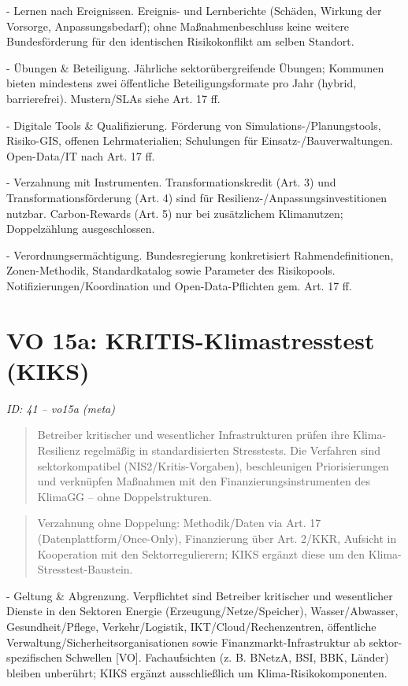 \documentclass[12pt,a4paper]{scrartcl}
\begin{document}
- Lernen nach Ereignissen. Ereignis- und Lernberichte (Schäden, Wirkung der Vorsorge, Anpassungsbedarf); ohne Maßnahmenbeschluss keine weitere Bundesförderung für den identischen Risikokonflikt am selben Standort.

- Übungen \& Beteiligung. Jährliche sektorübergreifende Übungen; Kommunen bieten mindestens zwei öffentliche Beteiligungsformate pro Jahr (hybrid, barrierefrei). Mustern/SLAs siehe Art. 17 ff.

- Digitale Tools \& Qualifizierung. Förderung von Simulations-/Planungstools, Risiko-GIS, offenen Lehrmaterialien; Schulungen für Einsatz-/Bauverwaltungen. Open-Data/IT nach Art. 17 ff.

- Verzahnung mit Instrumenten. Transformationskredit (Art. 3) und Transformationsförderung (Art. 4) sind für Resilienz-/Anpassungsinvestitionen nutzbar. Carbon-Rewards (Art. 5) nur bei zusätzlichem Klimanutzen; Doppelzählung ausgeschlossen.

- Verordnungsermächtigung. Bundesregierung konkretisiert Rahmendefinitionen, Zonen-Methodik, Standardkatalog sowie Parameter des Risikopools. Notifizierungen/Koordination und Open-Data-Pflichten gem. Art. 17 ff.


\section[VO 15a: KRITIS-Klimastresstest (KIKS)]{VO 15a: KRITIS-Klimastresstest (KIKS)}
\noindent\textit{ID: 41 -- vo15a (meta)}

\begin{quote}
Betreiber kritischer und wesentlicher Infrastrukturen prüfen ihre Klima-Resilienz regelmäßig in standardisierten Stresstests. Die Verfahren sind sektorkompatibel (NIS2/Kritis-Vorgaben), beschleunigen Priorisierungen und verknüpfen Maßnahmen mit den Finanzierungsinstrumenten des KlimaGG -- ohne Doppelstrukturen.
\end{quote}

{\footnotesize\begin{quote}
Verzahnung ohne Doppelung: Methodik/Daten via Art. 17 (Datenplattform/Once-Only), Finanzierung über Art. 2/KKR, Aufsicht in Kooperation mit den Sektorregulierern; KIKS ergänzt diese um den Klima-Stresstest-Baustein.
\end{quote}}


- Geltung \& Abgrenzung. Verpflichtet sind Betreiber kritischer und wesentlicher Dienste in den Sektoren Energie (Erzeugung/Netze/Speicher), Wasser/Abwasser, Gesundheit/Pflege, Verkehr/Logistik, IKT/Cloud/Rechenzentren, öffentliche Verwaltung/Sicherheitsorganisationen sowie Finanzmarkt-Infrastruktur ab sektor-spezifischen Schwellen [VO]. Fachaufsichten (z. B. BNetzA, BSI, BBK, Länder) bleiben unberührt; KIKS ergänzt ausschließlich um Klima-Risikokomponenten.
\end{document}
